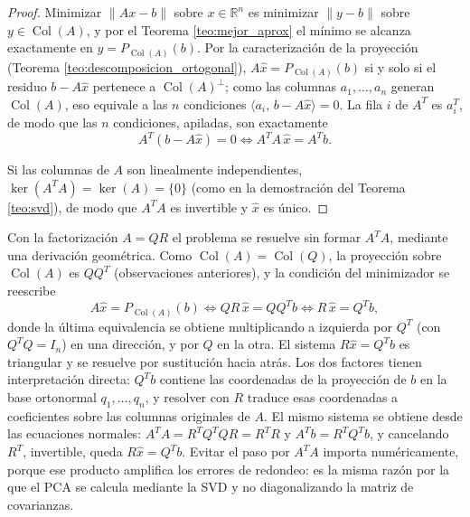 \documentclass[11pt, a4paper]{article}
\begin{document}
\begin{proof}
Minimizar $\|Ax - b\|$ sobre $x \in \mathbb{R}^n$ es minimizar $\|y - b\|$ sobre $y \in \operatorname{Col}(A)$, y por el Teorema \ref{teo:mejor_aprox} el mínimo se alcanza exactamente en $y = P_{\operatorname{Col}(A)}(b)$. Por la caracterización de la proyección (Teorema \ref{teo:descomposicion_ortogonal}), $A\hat{x} = P_{\operatorname{Col}(A)}(b)$ si y solo si el residuo $b - A\hat{x}$ pertenece a $\operatorname{Col}(A)^\perp$; como las columnas $a_1, \dots, a_n$ generan $\operatorname{Col}(A)$, eso equivale a las $n$ condiciones $\langle a_i, \, b - A\hat{x} \rangle = 0$. La fila $i$ de $A^T$ es $a_i^T$, de modo que las $n$ condiciones, apiladas, son exactamente
\[
A^T (b - A\hat{x}) = 0 \iff A^T A \, \hat{x} = A^T b.
\]

Si las columnas de $A$ son linealmente independientes, $\ker(A^T A) = \ker(A) = \{0\}$ (como en la demostración del Teorema \ref{teo:svd}), de modo que $A^T A$ es invertible y $\hat{x}$ es único.
\end{proof}

\obs Con la factorización $A = QR$ el problema se resuelve sin formar $A^T A$, mediante una derivación geométrica. Como $\operatorname{Col}(A) = \operatorname{Col}(Q)$, la proyección sobre $\operatorname{Col}(A)$ es $Q Q^T$ (observaciones anteriores), y la condición del minimizador se reescribe
\[
A \hat{x} = P_{\operatorname{Col}(A)}(b)
\iff Q R \, \hat{x} = Q Q^T b
\iff R \, \hat{x} = Q^T b,
\]
donde la última equivalencia se obtiene multiplicando a izquierda por $Q^T$ (con $Q^T Q = I_n$) en una dirección, y por $Q$ en la otra. El sistema $R \hat{x} = Q^T b$ es triangular y se resuelve por sustitución hacia atrás. Los dos factores tienen interpretación directa: $Q^T b$ contiene las coordenadas de la proyección de $b$ en la base ortonormal $q_1, \dots, q_n$, y resolver con $R$ traduce esas coordenadas a coeficientes sobre las columnas originales de $A$. El mismo sistema se obtiene desde las ecuaciones normales: $A^T A = R^T Q^T Q R = R^T R$ y $A^T b = R^T Q^T b$, y cancelando $R^T$, invertible, queda $R \hat{x} = Q^T b$. Evitar el paso por $A^T A$ importa numéricamente, porque ese producto amplifica los errores de redondeo: es la misma razón por la que el PCA se calcula mediante la SVD y no diagonalizando la matriz de covarianzas.
\end{document}
